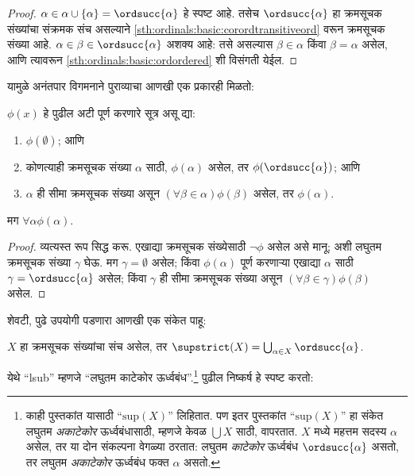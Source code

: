 \begin{proof}
$\alpha \in \alpha \cup \{\alpha\} = \ordsucc{\alpha}$ हे स्पष्ट आहे. तसेच $\ordsucc{\alpha}$ हा क्रमसूचक संख्यांचा संक्रमक संच असल्याने \ref{sth:ordinals:basic:corordtransitiveord} वरून क्रमसूचक संख्या आहे. $\alpha \in \beta \in \ordsucc{\alpha}$ अशक्य आहे: तसे असल्यास $\beta \in \alpha$ किंवा $\beta = \alpha$ असेल, आणि त्यावरून \ref{sth:ordinals:basic:ordordered} शी विसंगती येईल.
\end{proof}
\noindent
यामुळे अनंतपार विगमनाने पुराव्याचा आणखी एक प्रकारही मिळतो:

\begin{thm}[सुलभ अनंतपार विगमन]\label{sth:ordinals:opps:simpletransrecursion}
$\phi(x)$ हे पुढील अटी पूर्ण करणारे सूत्र असू द्या:
\begin{enumerate}
	\item $\phi(\emptyset)$; आणि
	\item कोणत्याही क्रमसूचक संख्या $\alpha$ साठी, $\phi(\alpha)$ असेल, तर $\phi(\ordsucc{\alpha})$; आणि
	\item $\alpha$ ही सीमा क्रमसूचक संख्या असून $(\forall \beta \in
	\alpha)\phi(\beta)$ असेल, तर $\phi(\alpha)$.
\end{enumerate}
मग $\forall \alpha \phi(\alpha)$.
\end{thm}

\begin{proof}
व्यत्यस्त रूप सिद्ध करू. एखाद्या क्रमसूचक संख्येसाठी $\lnot\phi$ असेल असे मानू; अशी लघुतम क्रमसूचक संख्या $\gamma$ घेऊ. मग $\gamma = \emptyset$ असेल; किंवा $\phi(\alpha)$ पूर्ण करणाऱ्या एखाद्या $\alpha$ साठी $\gamma = \ordsucc{\alpha}$ असेल; किंवा $\gamma$ ही सीमा क्रमसूचक संख्या असून $(\forall
\beta \in \gamma)\phi(\beta)$ असेल.
\end{proof}
\noindent
शेवटी, पुढे उपयोगी पडणारा आणखी एक संकेत पाहू:

\begin{defn}\label{sth:ordinals:opps:defsupstrict}
$X$ हा क्रमसूचक संख्यांचा संच असेल, तर $\supstrict(X) = \bigcup_{\alpha
\in X} \ordsucc{\alpha}$.
\end{defn}
\noindent
येथे ``lsub'' म्हणजे ``लघुतम काटेकोर ऊर्ध्वबंध''.\footnote{काही पुस्तकांत यासाठी ``$\text{sup}(X)$'' लिहितात. पण इतर पुस्तकांत ``$\text{sup}(X)$'' हा संकेत लघुतम \emph{अकाटेकोर} ऊर्ध्वबंधासाठी, म्हणजे केवळ $\bigcup X$ साठी, वापरतात. $X$ मध्ये महत्तम सदस्य $\alpha$ असेल, तर या दोन संकल्पना वेगळ्या ठरतात: लघुतम \emph{काटेकोर} ऊर्ध्वबंध $\ordsucc{\alpha}$ असतो, तर लघुतम \emph{अकाटेकोर} ऊर्ध्वबंध फक्त $\alpha$ असतो.} पुढील निष्कर्ष हे स्पष्ट करतो:

